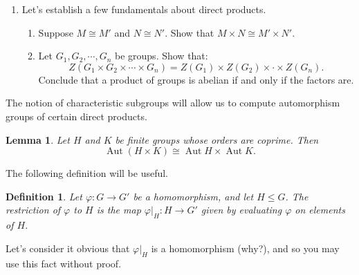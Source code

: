 \documentclass[11pt]{article}
\newtheorem{lemma}{Lemma}
\newtheorem{definition}[theorem]{Definition}
\newcommand{\Aut}{\operatorname{Aut}}
\newcommand{\bF}{\mathbb{F}}
\begin{document}
\begin{enumerate}
\begin{enumerate}
{    }
    \item{
    Show that $\overline T$ is a Sylow $p$-subgroup of $GL_2(\bF_p)$ and of $T$.
    }
    \item{
    Show that $N_{GL_2(\bF_p)}(\overline T) = T$.
    }
    \item{
    Show that $GL_2(\bF_p)$ has $p+1$ Sylow $p$-subgroups.
    }
    \item{
    Prove that $T$ is not normal in $GL_2(\bF_p)$.  (Hint: you could do this directly, or you could use Lemma \ref{LemmaA}).
    }
  \end{enumerate}
  \item Let's establish a few fundamentals about direct products.
  \begin{enumerate}
    \item{
  Suppose $M\cong M'$ and $N\cong N'$.  Show that $M\times N\cong M'\times N'$.
  }
   \item{
  Let $G_1,G_2,\cdots,G_n$ be groups.  Show that:
  \[Z(G_1\times G_2\times\cdots\times G_n) = Z(G_1)\times Z(G_2)\times\cdot\times Z(G_n).\]
  Conclude that a product of groups is abelian if and only if the factors are.
  }
  \end{enumerate}
  \end{enumerate}
  The notion of characteristic subgroups will allow us to compute automorphism groups of certain direct products.
  \begin{lemma}\label{autDecomp}
  Let $H$ and $K$ be finite groups whose orders are coprime.  Then \[\Aut(H\times K)\cong\Aut H\times \Aut K.\]
\end{lemma}
The following definition will be useful.
\begin{definition}
  Let $\varphi:G\to G'$ be a homomorphism, and let $H\le G$.  The \textit{restriction of} $\varphi$ \textit{to }$H$ is the map $\varphi|_H:H\to G'$ given by evaluating $\varphi$ on elements of $H$.
\end{definition}
Let's consider it obvious that $\varphi|_H$ is a homomorphism (why?), and so you may use this fact without proof.
\end{document}
